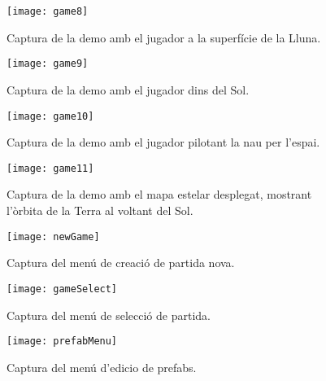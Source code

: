 \begin{figure}[]
  \centering
  \texttt{[image: game8]}
  \caption{Captura de la demo amb el jugador a la superfície de la Lluna.}
\end{figure}
\begin{figure}[]
  \centering
  \texttt{[image: game9]}
  \caption{Captura de la demo amb el jugador dins del Sol.}
\end{figure}
\begin{figure}[]
  \centering
  \texttt{[image: game10]}
  \caption{Captura de la demo amb el jugador pilotant la nau per l'espai.}
\end{figure}
\begin{figure}[]
  \centering
  \texttt{[image: game11]}
  \caption{Captura de la demo amb el mapa estelar desplegat, mostrant l'òrbita de la Terra al voltant del Sol.}
\end{figure}
\begin{figure}[]
  \centering
  \texttt{[image: newGame]}
  \caption{Captura del menú de creació de partida nova.}
\end{figure}
\begin{figure}[]
  \centering
  \texttt{[image: gameSelect]}
  \caption{Captura del menú de selecció de partida.}
\end{figure}
\begin{figure}[]
  \centering
  \texttt{[image: prefabMenu]}
  \caption{Captura del menú d'edicio de prefabs.}
\end{figure}
